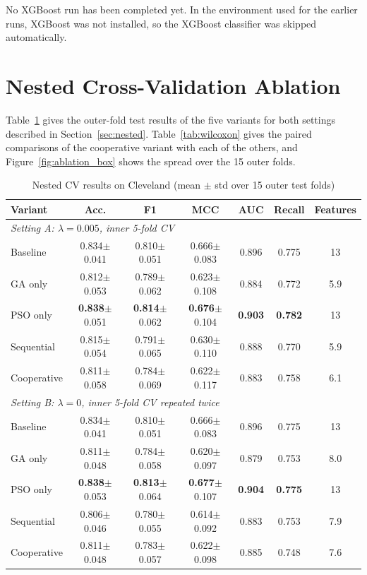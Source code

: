 \documentclass[MTech]{ugthesis}
\begin{document}
No XGBoost run has been completed yet. In the environment used for the earlier runs, XGBoost was not installed, so the XGBoost classifier was skipped automatically.

\section{Nested Cross-Validation Ablation}
\label{sec:ablation}
Table~\ref{tab:ablation} gives the outer-fold test results of the five variants for both settings described in Section~\ref{sec:nested}. Table~\ref{tab:wilcoxon} gives the paired comparisons of the cooperative variant with each of the others, and Figure~\ref{fig:ablation_box} shows the spread over the 15 outer folds.

\begin{table}[htpb]
\small
\renewcommand{\arraystretch}{1.25}
\caption{Nested CV results on Cleveland (mean $\pm$ std over 15 outer test folds)}
\label{tab:ablation}
\begin{tabular}{|p{2.4cm}|c|c|c|c|c|c|}
\hline
\textbf{Variant} & \textbf{Acc.} & \textbf{F1} & \textbf{MCC} & \textbf{AUC} & \textbf{Recall} & \textbf{Features} \\ \hline
\multicolumn{7}{|l|}{\textit{Setting A: $\lambda=0.005$, inner 5-fold CV}} \\ \hline
Baseline    & 0.834$\pm$0.041 & 0.810$\pm$0.051 & 0.666$\pm$0.083 & 0.896 & 0.775 & 13 \\
GA only     & 0.812$\pm$0.053 & 0.789$\pm$0.062 & 0.623$\pm$0.108 & 0.884 & 0.772 & 5.9 \\
PSO only    & \textbf{0.838}$\pm$0.051 & \textbf{0.814}$\pm$0.062 & \textbf{0.676}$\pm$0.104 & \textbf{0.903} & \textbf{0.782} & 13 \\
Sequential  & 0.815$\pm$0.054 & 0.791$\pm$0.065 & 0.630$\pm$0.110 & 0.888 & 0.770 & 5.9 \\
Cooperative & 0.811$\pm$0.058 & 0.784$\pm$0.069 & 0.622$\pm$0.117 & 0.883 & 0.758 & 6.1 \\ \hline
\multicolumn{7}{|l|}{\textit{Setting B: $\lambda=0$, inner 5-fold CV repeated twice}} \\ \hline
Baseline    & 0.834$\pm$0.041 & 0.810$\pm$0.051 & 0.666$\pm$0.083 & 0.896 & 0.775 & 13 \\
GA only     & 0.811$\pm$0.048 & 0.784$\pm$0.058 & 0.620$\pm$0.097 & 0.879 & 0.753 & 8.0 \\
PSO only    & \textbf{0.838}$\pm$0.053 & \textbf{0.813}$\pm$0.064 & \textbf{0.677}$\pm$0.107 & \textbf{0.904} & \textbf{0.775} & 13 \\
Sequential  & 0.806$\pm$0.046 & 0.780$\pm$0.055 & 0.614$\pm$0.092 & 0.883 & 0.753 & 7.9 \\
Cooperative & 0.811$\pm$0.048 & 0.783$\pm$0.057 & 0.622$\pm$0.098 & 0.885 & 0.748 & 7.6 \\ \hline
\end{tabular}
\end{table}
\end{document}
